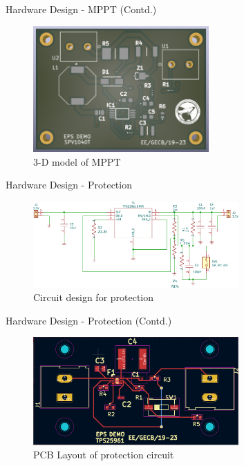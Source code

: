 \documentclass[aspectratio=169]{beamer}
\begin{document}
		\begin{frame}{Hardware Design - MPPT (Contd.)}
			\begin{figure}[h]
				\centering
				\includegraphics[width=0.6\textwidth]{diag/MpptDemo3d.png}
				\caption{3-D model of MPPT}
				\label{fig:mesh1}
			\end{figure}
		\end{frame}
		\begin{frame}{Hardware Design - Protection }
			\begin{figure}[h]
				\centering
				\includegraphics[width=0.7\textwidth]{diag/Prot_Circ.pdf}
				\caption{Circuit design for protection}
				\label{fig:mesh1}
			\end{figure}
		\end{frame}
		\begin{frame}{Hardware Design - Protection (Contd.) }
			\begin{figure}[h]
				\centering
				\includegraphics[width=0.7\textwidth]{diag/prot_circ_layout2.png}
				\caption{PCB Layout of protection circuit}
				\label{fig:mesh1}
			\end{figure}
		\end{frame}
\end{document}
